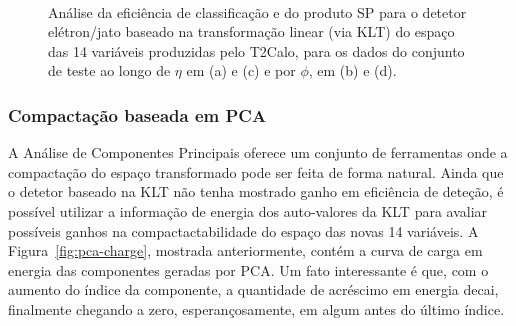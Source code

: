 \begin{figure}
\begin{center}
\mbox{%
}
\mbox{%
}
\end{center}
\caption{Análise da eficiência de classificação e do produto SP para 
o detetor elétron/jato baseado na transformação linear (via KLT) do espaço das
14 variáveis produzidas pelo T2Calo, para os dados do conjunto de teste ao
longo de $\eta$ em (a) e (c) e por $\phi$, em (b) e (d).}
\label{fig:pca-eta-phi}
\end{figure}




\subsubsection{Compactação baseada em PCA}

A Análise de Componentes Principais oferece um conjunto de ferramentas onde a
compactação do espaço transformado pode ser feita de forma natural. Ainda que
o detetor baseado na KLT não tenha mostrado ganho em eficiência de deteção, é
possível utilizar a informação de energia dos auto-valores da KLT para avaliar
possíveis ganhos na compactactabilidade do espaço das novas 14 variáveis. A
Figura~\ref{fig:pca-charge}, mostrada anteriormente, contém a curva de carga
em energia das componentes geradas por PCA. Um fato interessante é que, com o
aumento do índice da componente, a quantidade de acréscimo em energia decai,
finalmente chegando a zero, esperançosamente, em algum antes do último
índice. 

